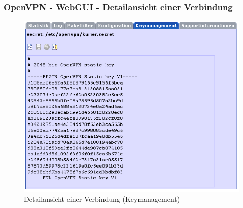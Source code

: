 \subsubsection{OpenVPN - WebGUI - Detailansicht einer Verbindung}
  \begin{figure}[!h]
    \centering
    \includegraphics[width=400pt]{detail}
    \caption{Detailansicht einer Verbindung (Keymanagement)}
    \label{fig:guidetail}
  \end{figure}

